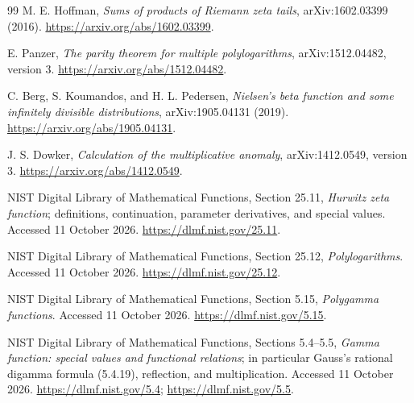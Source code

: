 \documentclass[11pt,a4paper]{article}
\numberwithin{equation}{section}
\theoremstyle{definition}
\theoremstyle{remark}
\begin{document}
\begin{thebibliography}{99}
M. E. Hoffman, \emph{Sums of products of Riemann zeta tails},
arXiv:1602.03399 (2016).
\url{https://arxiv.org/abs/1602.03399}.

E. Panzer, \emph{The parity theorem for multiple polylogarithms},
arXiv:1512.04482, version 3.
\url{https://arxiv.org/abs/1512.04482}.

C. Berg, S. Koumandos, and H. L. Pedersen,
\emph{Nielsen's beta function and some infinitely divisible
distributions}, arXiv:1905.04131 (2019).
\url{https://arxiv.org/abs/1905.04131}.

J. S. Dowker, \emph{Calculation of the multiplicative anomaly},
arXiv:1412.0549, version 3.
\url{https://arxiv.org/abs/1412.0549}.

NIST Digital Library of Mathematical Functions, Section 25.11,
\emph{Hurwitz zeta function}; definitions, continuation, parameter
derivatives, and special values. Accessed 11 October 2026.
\url{https://dlmf.nist.gov/25.11}.

NIST Digital Library of Mathematical Functions, Section 25.12,
\emph{Polylogarithms}. Accessed 11 October 2026.
\url{https://dlmf.nist.gov/25.12}.

NIST Digital Library of Mathematical Functions, Section 5.15,
\emph{Polygamma functions}. Accessed 11 October 2026.
\url{https://dlmf.nist.gov/5.15}.

NIST Digital Library of Mathematical Functions, Sections 5.4--5.5,
\emph{Gamma function: special values and functional relations};
in particular Gauss's rational digamma formula (5.4.19), reflection,
and multiplication. Accessed 11 October 2026.
\url{https://dlmf.nist.gov/5.4}; \url{https://dlmf.nist.gov/5.5}.

\end{thebibliography}


\end{document}
